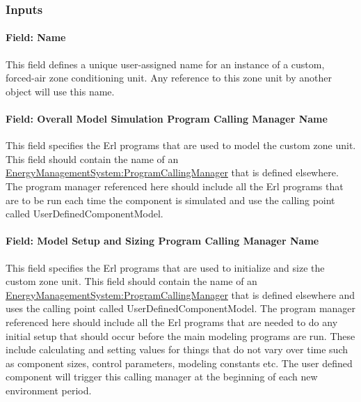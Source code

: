 \subsubsection{Inputs}\label{inputs-050}

\paragraph{Field: Name}\label{field-name-049}

This field defines a unique user-assigned name for an instance of a custom, forced-air zone conditioning unit. Any reference to this zone unit by another object will use this name.

\paragraph{Field: Overall Model Simulation Program Calling Manager Name}\label{field-overall-model-simulation-program-calling-manager-name}

This field specifies the Erl programs that are used to model the custom zone unit. This field should contain the name of an \hyperref[energymanagementsystemprogramcallingmanager]{EnergyManagementSystem:ProgramCallingManager} that is defined elsewhere. The program manager referenced here should include all the Erl programs that are to be run each time the component is simulated and use the calling point called UserDefinedComponentModel.

\paragraph{Field: Model Setup and Sizing Program Calling Manager Name}\label{field-model-setup-and-sizing-program-calling-manager-name}

This field specifies the Erl programs that are used to initialize and size the custom zone unit. This field should contain the name of an \hyperref[energymanagementsystemprogramcallingmanager]{EnergyManagementSystem:ProgramCallingManager} that is defined elsewhere and uses the calling point called UserDefinedComponentModel. The program manager referenced here should include all the Erl programs that are needed to do any initial setup that should occur before the main modeling programs are run. These include calculating and setting values for things that do not vary over time such as component sizes, control parameters, modeling constants etc. The user defined component will trigger this calling manager at the beginning of each new environment period.

